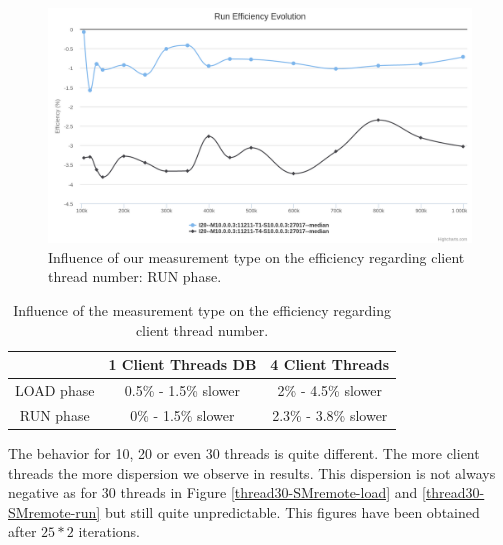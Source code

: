 \documentclass[a4paper,11pt]{report}
\begin{document}
\begin{figure}[ht]
\begin{center}
\includegraphics[width=1\linewidth]{images/evaluation/thread-SMremote-run.png}
\caption{Influence of our measurement type on the efficiency regarding client thread number: RUN phase.}
\label{thread-SMremote-run}
\end{center}
\end{figure}

\begin{table}[ht]
\begin{center}
	\begin{tabular}{|c|c|c|}
		\hline
		  & 1 Client Threads DB & 4 Client Threads \\
		\hline
	   	LOAD phase & 0.5\% - 1.5\% slower & 2\% - 4.5\% slower \\
	   	RUN phase & 0\% - 1.5\% slower & 2.3\% - 3.8\% slower \\
	    \hline
	\end{tabular}
	\caption{Influence of the measurement type on the efficiency regarding client thread number.}
\label{benchmarked-table}
\end{center}
\end{table}

The behavior for 10, 20 or even 30 threads is quite different. The more client threads the more dispersion we observe in results. This dispersion is not always negative as for 30 threads in Figure \ref{thread30-SMremote-load} and \ref{thread30-SMremote-run} but still quite unpredictable. This figures have been obtained after $25*2$ iterations.
\end{document}
